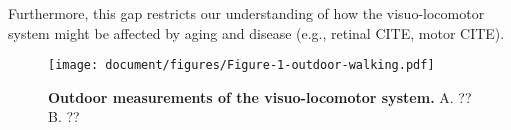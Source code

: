  Furthermore, this gap restricts our understanding of how the visuo-locomotor system might be affected by aging and disease (e.g., retinal CITE, motor CITE).  



\begin{figure}[h]
\centering
\texttt{[image: document/figures/Figure-1-outdoor-walking.pdf]}
\caption{\textbf{Outdoor measurements of the visuo-locomotor system.} A. ?? B. ??}
\end{figure}
